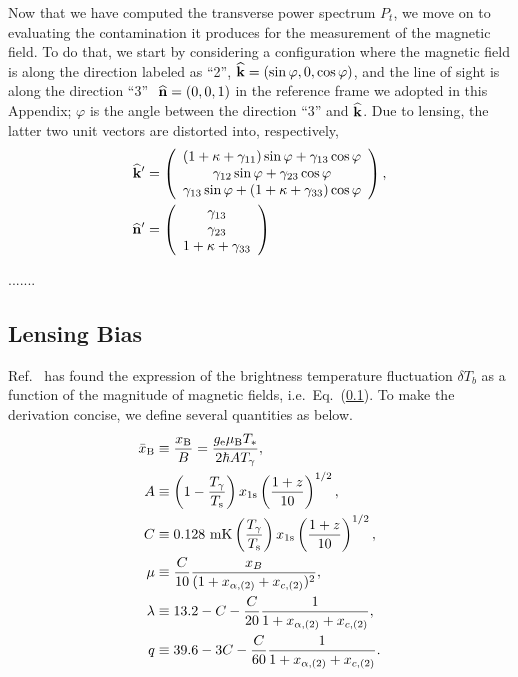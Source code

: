 Now that we have computed the transverse power spectrum $P_t$, we move on to evaluating the contamination it produces for the measurement of the magnetic field. To do that, we start by considering a configuration where the magnetic field is along the direction labeled as ``2'', ${\bf{\widehat k}}=(\sin\varphi,0,\cos\varphi)$, and the line of sight is along the direction ``3'' $\ {\bf{\widehat n}}=(0,0,1)$ in the reference frame we adopted in this Appendix; $\varphi$ is the angle between the direction ``3'' and ${\bf{\widehat k}}$. Due to lensing, the latter two unit vectors are distorted into, respectively,
\begin{align}
{\bf{\widehat k}}'&=\left(\begin{array}{c}
(1+\kappa+\gamma_{11})\sin\varphi+\gamma_{13}\cos\varphi\\
\gamma_{12}\sin\varphi+\gamma_{23}\cos\varphi\\
\gamma_{13}\sin\varphi+(1+\kappa+\gamma_{33})\cos\varphi
\end{array}\right),\nonumber\\
{\bf{\widehat n}}'&=\left(\begin{array}{c}
\gamma_{13}\\
\gamma_{23}\\
1+\kappa+\gamma_{33}
\end{array}\right)
\label{eq:distorted_kn}
\end{align}





.......

\subsection{Lensing Bias}
Ref.~\cite{Venumadhav:2014tqa} has found the expression of the brightness temperature fluctuation $\delta T_b$ as a function of the magnitude of magnetic fields, i.e.~Eq.~(\ref{}). To make the derivation concise, we define several quantities as below.
\begin{align}
\bar{x}_{\rm B}&\equiv\frac{x_{\rm B}}{B} = \frac{g_{\rm e} \mu_{\rm B} T_*}{2 \hbar A T_\gamma},\\
A&\equiv\left( 1 - \frac{T_\gamma}{T_{\rm s}} \right) x_{1{\rm s}} \left( \frac{1+z}{10} \right)^{1/2},\\
C&\equiv0.128 \ {\rm mK} \left( \frac{T_\gamma}{T_{\rm s}} \right) x_{1{\rm s}} \left( \frac{1+z}{10} \right)^{1/2},\\
\mu&\equiv\frac{C}{10}\frac{x_B}{(1+x_{\alpha,(2)}+x_{c,(2)})^2},\\
\lambda&\equiv 13.2-C-\frac{C}{20}\frac{1}{1+x_{\alpha,(2)}+x_{c,(2)}},\\
q&\equiv 39.6-3C-\frac{C}{60}\frac{1}{1+x_{\alpha,(2)}+x_{c,(2)}}.
\end{align}


